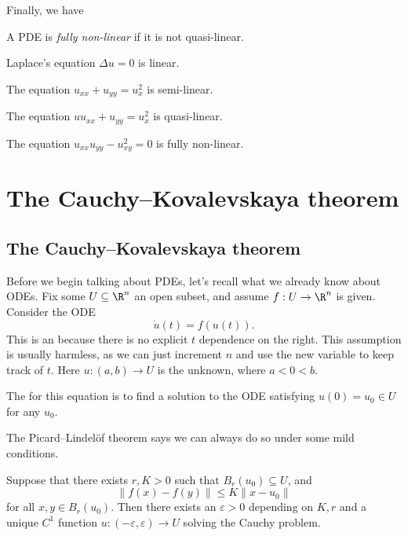 \documentclass[a4paper]{article}
\begin{document}
Finally, we have
\begin{defi}
  A PDE is \emph{fully non-linear} if it is not quasi-linear.
\end{defi}

\begin{eg}
  Laplace's equation $\Delta u = 0$ is linear.
\end{eg}

\begin{eg}
  The equation $u_{xx} + u_{yy} = u_x^2$ is semi-linear.
\end{eg}

\begin{eg}
  The equation $uu_{xx} + u_{yy} = u_x^2$ is quasi-linear.
\end{eg}

\begin{eg}
  The equation $u_{xx} u_{yy} - u_{xy}^2 = 0$ is fully non-linear.
\end{eg}

\section{The Cauchy--Kovalevskaya theorem}

\subsection{The Cauchy--Kovalevskaya theorem}
Before we begin talking about PDEs, let's recall what we already know about ODEs. Fix some $U \subseteq \R^n$ an open subset, and assume $f: U \to \R^n$ is given. Consider the ODE
\[
  \dot{u}(t) = f(u(t)).
\]
This is an  because there is no explicit $t$ dependence on the right. This assumption is usually harmless, as we can just increment $n$ and use the new variable to keep track of $t$. Here $u: (a, b) \to U$ is the unknown, where $a < 0 < b$.

The  for this equation is to find a solution to the ODE satisfying $u(0) = u_0 \in U$ for any $u_0$.

The Picard--Lindel\"of theorem says we can always do so under some mild conditions.
\begin{thm}
  Suppose that there exists $r, K > 0$ such that $B_r(u_0) \subseteq U$, and
  \[
    \|f(x) - f(y)\| \leq K \|x - u_0\|
  \]
  for all $x, y \in B_r(u_0)$. Then there exists an $\varepsilon > 0$ depending on $K, r$ and a unique $C^1$ function $u: (-\varepsilon, \varepsilon) \to U$ solving the Cauchy problem.
\end{thm}
\end{document}

